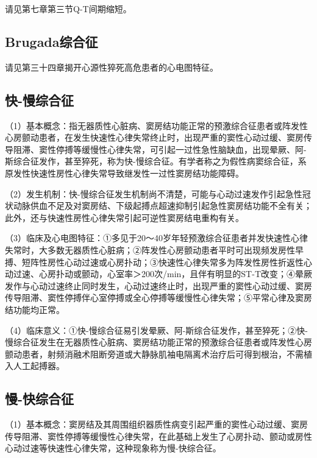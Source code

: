 请见第七章第三节Q-T间期缩短。

\protect\hypertarget{text00047.htmlux5cux23subid557}{}{}

\subsection{Brugada综合征}

请见第三十四章揭开心源性猝死高危患者的心电图特征。

\protect\hypertarget{text00047.htmlux5cux23subid558}{}{}

\subsection{快-慢综合征}

（1）基本概念：指无器质性心脏病、窦房结功能正常的预激综合征患者或阵发性心房颤动患者，在发生快速性心律失常终止时，出现严重的窦性心动过缓、窦房传导阻滞、窦性停搏等缓慢性心律失常，可引起一过性急性脑缺血，出现晕厥、阿-斯综合征发作，甚至猝死，称为快-慢综合征。有学者称之为假性病窦综合征，系原发性快速性房性心律失常导致继发性一过性窦房结功能障碍。

（2）发生机制：快-慢综合征发生机制尚不清楚，可能与心动过速发作引起急性冠状动脉供血不足及对窦房结、下级起搏点超速抑制引起急性窦房结功能不全有关；此外，还与快速性房性心律失常引起可逆性窦房结电重构有关。

（3）临床及心电图特征：①多见于20～40岁年轻预激综合征患者并发快速性心律失常时，大多数无器质性心脏病；②阵发性心房颤动患者平时可出现频发房性早搏、短阵性房性心动过速或心房扑动；③快速性心律失常多为阵发性房性折返性心动过速、心房扑动或颤动，心室率＞200次/min，且伴有明显的ST-T改变；④晕厥发作与心动过速终止同时发生，心动过速终止时，出现严重的窦性心动过缓、窦房传导阻滞、窦性停搏伴心室停搏或全心停搏等缓慢性心律失常；⑤平常心律及窦房结功能均正常。

（4）临床意义：①快-慢综合征易引发晕厥、阿-斯综合征发作，甚至猝死；②快-慢综合征发生在无器质性心脏病、窦房结功能正常的预激综合征患者或阵发性心房颤动患者，射频消融术阻断旁道或大静脉肌袖电隔离术治疗后可得到根治，不需植入人工起搏器。

\protect\hypertarget{text00047.htmlux5cux23subid559}{}{}

\subsection{慢-快综合征}

（1）基本概念：窦房结及其周围组织器质性病变引起严重的窦性心动过缓、窦房传导阻滞、窦性停搏等缓慢性心律失常，在此基础上发生了心房扑动、颤动或房性心动过速等快速性心律失常，这种现象称为慢-快综合征。

